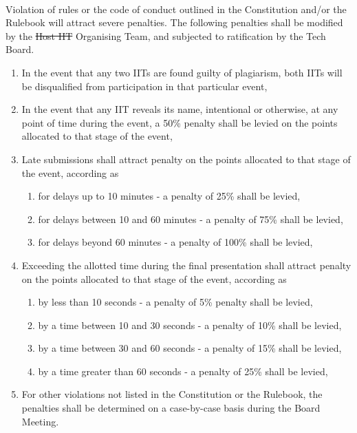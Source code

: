 
\paragraph{}
Violation of rules or the code of conduct outlined in the Constitution and/or the Rulebook will attract severe penalties. The following penalties shall be modified by the \st{Host IIT} Organising Team, and subjected to ratification by the Tech Board.
\begin{enumerate}
    \item In the event that any two IITs are found guilty of plagiarism, both IITs will be disqualified from participation in that particular event,
    \item In the event that any IIT reveals its name, intentional or otherwise, at any point of time during the event, a 50\% penalty shall be levied on the points allocated to that stage of the event,
    \item Late submissions shall attract penalty on the points allocated to that stage of the event, according as
    \begin{enumerate}
        \item for delays up to 10 minutes - a penalty of 25\% shall be levied,
        \item for delays between 10 and 60 minutes - a penalty of 75\% shall be levied,
        \item for delays beyond 60 minutes - a penalty of 100\% shall be levied,
    \end{enumerate}
    \item Exceeding the allotted time during the final presentation shall attract penalty on the points allocated to that stage of the event, according as
    \begin{enumerate}
        \item by less than 10 seconds - a penalty of 5\% penalty shall be levied,
        \item by a time between 10 and 30 seconds - a penalty of 10\% shall be levied,
        \item by a time between 30 and 60 seconds - a penalty of 15\% shall be levied,
        \item by a time greater than 60 seconds - a penalty of 25\% shall be levied,
    \end{enumerate}
    \item For other violations not listed in the Constitution or the Rulebook, the penalties shall be determined on a case-by-case basis during the Board Meeting.

\end{enumerate}
